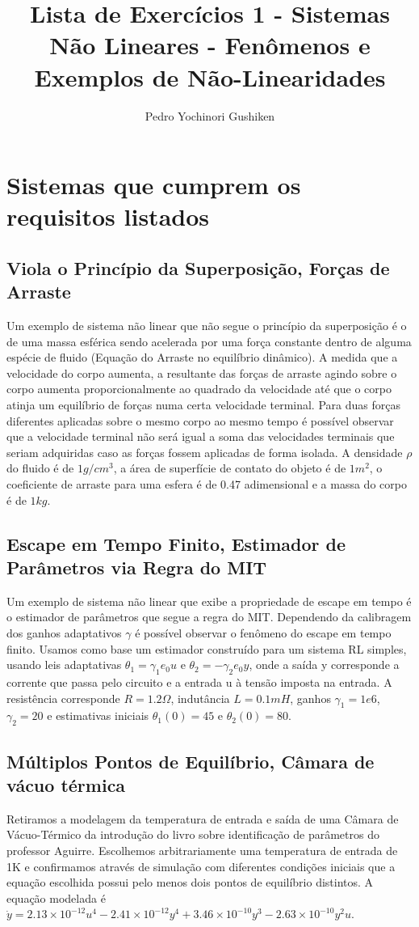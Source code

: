 \documentclass[11pt]{report}
\title{Lista de Exercícios 1 - Sistemas Não Lineares - Fenômenos e Exemplos de Não-Linearidades}
\author{Pedro Yochinori Gushiken}
\begin{document}
\maketitle
\chapter{Sistemas que cumprem os requisitos listados}
\section{Viola o Princípio da Superposição, Forças de Arraste}
Um exemplo de sistema não linear que não segue o princípio da superposição é o de uma massa esférica sendo acelerada por uma força constante dentro de alguma espécie de fluido (Equação do Arraste no equilíbrio dinâmico). A medida que a velocidade do corpo aumenta, a resultante das forças de arraste agindo sobre o corpo aumenta proporcionalmente ao quadrado da velocidade até que o corpo atinja um equilíbrio de forças numa certa velocidade terminal. Para duas forças diferentes aplicadas sobre o mesmo corpo ao mesmo tempo é possível observar que a velocidade terminal não será igual a soma das velocidades terminais que seriam adquiridas caso as forças fossem aplicadas de forma isolada. A densidade $\rho$ do fluido é de $1g/{cm}^3$, a área de superfície de contato do objeto é de $1m^2$, o coeficiente de arraste para uma esfera é de 0.47 adimensional e a massa do corpo é de $1kg$.
\section{Escape em Tempo Finito, Estimador de Parâmetros via Regra do MIT}

Um exemplo de sistema não linear que exibe a propriedade de escape em tempo é o estimador de parâmetros que segue a regra do MIT. Dependendo da calibragem dos ganhos adaptativos $\gamma$ é possível observar o fenômeno do escape em tempo finito. Usamos como base um estimador construído para um sistema RL simples, usando leis adaptativas $\theta_1 = \gamma_1 e_0 u$ e $\theta_2 = -\gamma_2 e_0 y$, onde a saída y corresponde a corrente que passa pelo circuito e a entrada u à tensão imposta na entrada. A resistência corresponde $R=1.2\Omega$, indutância $L=0.1mH$, ganhos $\gamma_1=1e6$, $\gamma_2=20$ e estimativas iniciais $\theta_1(0)=45$ e $\theta_2(0)=80$.
\section{Múltiplos Pontos de Equilíbrio, Câmara de vácuo térmica}
Retiramos a modelagem da temperatura de entrada e saída de uma Câmara de Vácuo-Térmico da introdução do livro sobre identificação de parâmetros do professor Aguirre. Escolhemos arbitrariamente uma temperatura de entrada de 1K e confirmamos através de simulação com diferentes condições iniciais que a equação escolhida possui pelo menos dois pontos de equilíbrio distintos. A equação modelada é $\dot{y}=2.13\times 10^{-12} u^4 - 2.41\times 10^{-12} y^4 + 3.46\times 10^{-10} y^3 - 2.63\times 10^{-10} y^2 u$.
\end{document}

